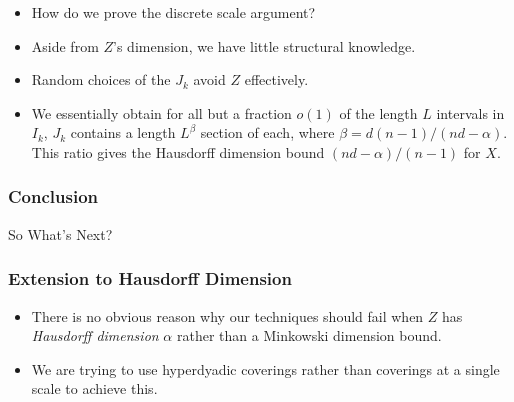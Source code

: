 \documentclass[usenames,dvipsnames]{beamer}
\begin{document}
\begin{frame}
\begin{figure}
    \end{figure}

    \begin{itemize}
        \item How do we prove the discrete scale argument?

        \pause
        \item Aside from $Z$'s dimension, we have little structural knowledge.

        \pause
        \item Random choices of the $J_k$ avoid $Z$ effectively.

        \item We essentially obtain for all but a fraction $o(1)$ of the length $L$ intervals in $I_k$, $J_k$ contains a length $L^\beta$ section of each, where $\beta = d(n-1)/(nd - \alpha)$. This ratio gives the Hausdorff dimension bound $(nd-\alpha)/(n-1)$ for $X$.
    \end{itemize}
\end{frame}

\begin{frame}
    \frametitle{Conclusion}

    {\Huge So What's Next?}
\end{frame}

\begin{frame}
    \frametitle{Extension to Hausdorff Dimension}

    \begin{itemize}
        \item There is no obvious reason why our techniques should fail when $Z$ has {\it Hausdorff dimension} $\alpha$ rather than a Minkowski dimension bound.

        \pause
        \item We are trying to use hyperdyadic coverings rather than coverings at a single scale to achieve this.
    \end{itemize}
\end{frame}
\end{document}
